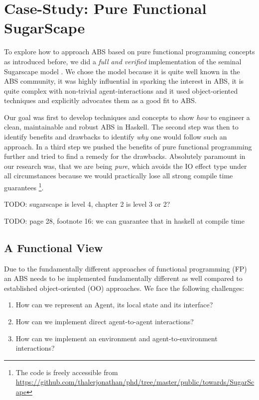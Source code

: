 \section{Case-Study: Pure Functional SugarScape}
\label{sec:case_study}

To explore how to approach ABS based on pure functional programming concepts as introduced before, we did a \textit{full and verified} implementation of the seminal Sugarscape model \cite{epstein_growing_1996}. We chose the model because it is quite well known in the ABS community, it was highly influential in sparking the interest in ABS, it is quite complex with non-trivial agent-interactions and it used object-oriented techniques and explicitly advocates them as a good fit to ABS. 

Our goal was first to develop techniques and concepts to show \textit{how} to engineer a clean, maintainable and robust ABS in Haskell. The second step was then to identify benefits and drawbacks to identify \textit{why} one would follow such an approach. In a third step we pushed the benefits of pure functional programming further and tried to find a remedy for the drawbacks. Absolutely paramount in our research was, that we are being \textit{pure}, which avoids the IO effect type under all circumstances because we would practically lose all strong compile time guarantees \footnote{The code is freely accessible from \url{https://github.com/thalerjonathan/phd/tree/master/public/towards/SugarScape}}.

TODO: \cite{macal_everything_2016} sugarscape is level 4, chapter 2 is level 3 or 2?

TODO: page 28, footnote 16: we can guarantee that in haskell at compile time

\subsection{A Functional View}
Due to the fundamentally different approaches of functional programming (FP) an ABS needs to be implemented fundamentally different as well compared to established object-oriented (OO) approaches. We face the following challenges:

\begin{enumerate}
	\item How can we represent an Agent, its local state and its interface?
	\item How can we implement direct agent-to-agent interactions?
	\item How can we implement an environment and agent-to-environment interactions? 
\end{enumerate}

